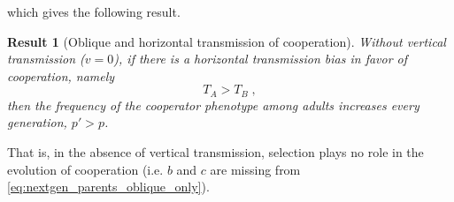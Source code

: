 \documentclass[12pt]{extarticle}
\newtheorem{result}{Result}
\begin{document}
which gives the following result.\\

\begin{result}[Oblique and horizontal transmission of cooperation] \label{result:obli_hori}
Without vertical transmission ($v=0$), if there is a horizontal transmission bias in favor of cooperation, namely
\begin{equation} \label{eq:oblique_only_result}
T_A > T_B \;,
\end{equation}
then the frequency of the cooperator phenotype among adults increases every generation, $p'>p$.
\end{result}

That is, in the absence of vertical transmission, selection plays no role in the evolution of cooperation (i.e. $b$ and $c$ are missing from \autoref{eq:nextgen_parents_oblique_only}).
\end{document}
